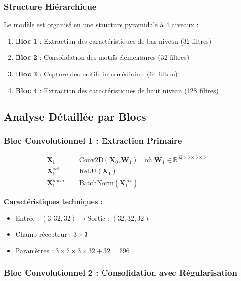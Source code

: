 \documentclass[12pt,a4paper]{article}
\begin{document}
\subsubsection{Structure Hiérarchique}

Le modèle est organisé en une structure pyramidale à 4 niveaux :

\begin{enumerate}
    \item \textbf{Bloc 1} : Extraction des caractéristiques de bas niveau (32 filtres)
    \item \textbf{Bloc 2} : Consolidation des motifs élémentaires (32 filtres)
    \item \textbf{Bloc 3} : Capture des motifs intermédiaires (64 filtres)
    \item \textbf{Bloc 4} : Extraction des caractéristiques de haut niveau (128 filtres)
\end{enumerate}

\subsection{Analyse Détaillée par Blocs}

\subsubsection{Bloc Convolutionnel 1 : Extraction Primaire}

\begin{align}
\mathbf{X}_1 &= \text{Conv2D}(\mathbf{X}_0, \mathbf{W}_1) \quad \text{où } \mathbf{W}_1 \in \mathbb{R}^{32 \times 3 \times 3 \times 3} \\
\mathbf{X}_1^{act} &= \text{ReLU}(\mathbf{X}_1) \\
\mathbf{X}_1^{norm} &= \text{BatchNorm}(\mathbf{X}_1^{act})
\end{align}

\textbf{Caractéristiques techniques :}
\begin{itemize}
    \item Entrée : $(3, 32, 32)$ → Sortie : $(32, 32, 32)$
    \item Champ récepteur : $3 \times 3$
    \item Paramètres : $3 \times 3 \times 3 \times 32 + 32 = 896$
\end{itemize}

\subsubsection{Bloc Convolutionnel 2 : Consolidation avec Régularisation}
\end{document}
